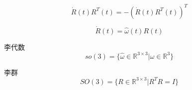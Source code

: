 \begin{equation}
  \dot{R}(t) R^T(t) = -(\dot{R}(t) R^T(t))^T
\end{equation}

\begin{equation}
  \dot{R}(t) = \hat{\omega}(t) R(t)
\end{equation}

李代数
\begin{equation}
  so(3) = \{ \hat{\omega} \in \mathbb{R}^{3\times 3} | \omega \in \mathbb{R}^3 \}
\end{equation}

李群
\begin{equation}
  SO(3) = \{ R \in \mathbb{R}^{3\times 3} | R^T R = I \}
\end{equation}
